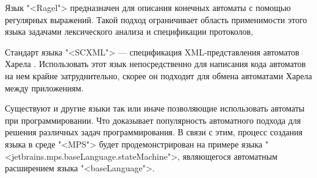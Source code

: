 Язык "<Ragel"> предназначен для описания конечных автоматы с помощью регулярных выражений. Такой подход ограничивает область применимости этого языка задачами лексического анализа и спецификации протоколов,

Стандарт языка "<SCXML"> --- спецификация XML-представления автоматов Харела \cite{harel}. Использовать этот язык непосредственно для написания кода автоматов на нем крайне затруднительно, скорее он подходит для обмена автоматами Харела между приложениям.

Существуют и другие языки так или иначе позволяющие использовать автоматы при программировании. Что доказывает популярность автоматного подхода для решения различных задач программирования. В связи с этим, процесс создания языка в среде "<MPS"> будет продемонстрирован на примере языка "<jetbrains.mps.baseLanguage.stateMachine">, являющегося автоматным расширением языка "<baseLanguage">.
